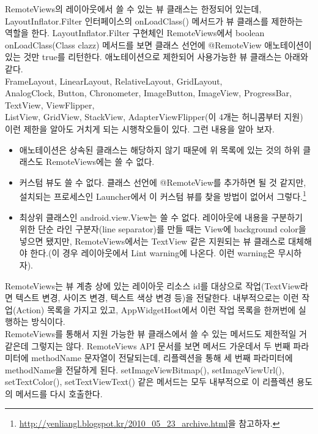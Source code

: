 RemoteViews의 레이아웃에서 쓸 수 있는 뷰 클래스는 한정되어 있는데, LayoutInflator.Filter 인터페이스의  onLoadClass() 메서드가 뷰 클래스를 제한하는 역할을 한다. LayoutInflator.Filter 구현체인 RemoteViews에서 boolean onLoadClass(Class clazz) 메서드를 보면 클래스 선언에 @RemoteView 애노테이션이 있는 것만 true를 리턴한다.
애노테이션으로 제한되어 사용가능한 뷰 클래스는 아래와 같다.\\

FrameLayout, LinearLayout, RelativeLayout, GridLayout,\\
AnalogClock, Button, Chronometer, ImageButton, ImageView, ProgressBar, TextView, ViewFlipper,\\
ListView, GridView, StackView, AdapterViewFlipper(이 4개는 허니콤부터 지원)\\

이런 제한을 알아도 거치게 되는 시행착오들이 있다. 그런 내용을 알아 보자.
\begin{itemize}
\item 애노테이션은 상속된 클래스는 해당하지 않기 때문에 위 목록에 있는 것의 하위 클래스도 RemoteViews에는 쓸 수 없다.
\item 커스텀 뷰도 쓸 수 없다. 클래스 선언에 @RemoteView를 추가하면 될 것 같지만, 설치되는 프로세스인 Launcher에서 이 커스텀 뷰를 찾을 방법이 없어서 그렇다.\footnote{\url{http://yenliangl.blogspot.kr/2010\_05\_23\_archive.html}을 참고하자.}
\item 최상위 클래스인 android.view.View는 쓸 수 없다. 레이아웃에 내용을 구분하기 위한 단순 라인 구분자(line separator)를 만들 때는 View에 background color을 넣으면 됐지만, RemoteViews에서는 TextView 같은 지원되는 뷰 클래스로 대체해야 한다.(이 경우 레이아웃에서 Lint warning에 나온다. 이런 warning은 무시하자).
\end{itemize}

RemoteViews는 뷰 계층 상에 있는 레이아웃 리소스 id를 대상으로 작업(TextView라면 텍스트 변경, 사이즈 변경, 텍스트 색상 변경 등)을 전달한다.
내부적으로는 이런 작업(Action) 목록을 가지고 있고, AppWidgetHost에서 이런 작업 목록을 한꺼번에 실행하는 방식이다.\\

RemoteViews를 통해서 지원 가능한 뷰 클래스에서 쓸 수 있는 메서드도 제한적일 거 같은데 그렇지는 않다. 
RemoteViews API 문서를 보면 메서드 가운데서 두 번째 파라미터에 methodName 문자열이 전달되는데, 리플렉션을 통해 세 번째 파라미터에 methodName을 전달하게 된다.
setImageViewBitmap(), setImageViewUrl(), setTextColor(), setTextViewText() 같은 메서드는 모두 내부적으로 이 리플렉션 용도의 메서드를 다시 호출한다.\\

